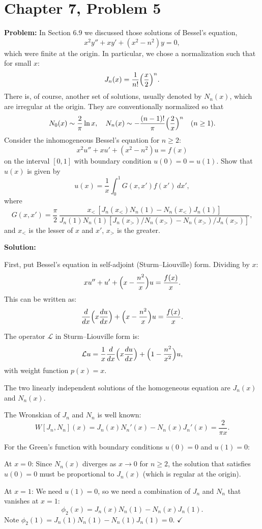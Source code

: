 \documentclass[12pt]{article}
\begin{document}
\section*{Chapter 7, Problem 5}

\textbf{Problem:} In Section 6.9 we discussed those solutions of Bessel's equation,
\[
x^2y'' + xy' + (x^2 - n^2)y = 0,
\]
which were finite at the origin. In particular, we chose a normalization such that for small $x$:
\[
J_n(x) = \frac{1}{n!}\Bigl(\frac{x}{2}\Bigr)^n.
\]
There is, of course, another set of solutions, usually denoted by $N_n(x)$, which are irregular at the origin. They are conventionally normalized so that
\[
N_0(x) \sim \frac{2}{\pi}\ln x, \quad N_n(x) \sim -\frac{(n-1)!}{\pi}\Bigl(\frac{2}{x}\Bigr)^n \quad (n \ge 1).
\]
Consider the inhomogeneous Bessel's equation for $n \ge 2$:
\[
x^2u'' + xu' + (x^2 - n^2)u = f(x)
\]
on the interval $[0,1]$ with boundary condition $u(0) = 0 = u(1)$. Show that $u(x)$ is given by
\[
u(x) = \frac{1}{x}\int_0^1 G(x,x')f(x')\,dx',
\]
where
\[
G(x,x') = \frac{\pi}{2}\,\frac{x_<\,[J_n(x_<)N_n(1) - N_n(x_<)J_n(1)]}{J_n(1)N_n(1)[J_n(x_>)/N_n(x_>) - N_n(x_>)/J_n(x_>)]},
\]
and $x_<$ is the lesser of $x$ and $x'$, $x_>$ is the greater.

\bigskip
\textbf{Solution:}

First, put Bessel's equation in self-adjoint (Sturm--Liouville) form. Dividing by $x$:
\[
xu'' + u' + \Bigl(x - \frac{n^2}{x}\Bigr)u = \frac{f(x)}{x}.
\]
This can be written as:
\[
\frac{d}{dx}\Bigl(x\frac{du}{dx}\Bigr) + \Bigl(x - \frac{n^2}{x}\Bigr)u = \frac{f(x)}{x}.
\]

The operator $\mathcal{L}$ in Sturm--Liouville form is:
\[
\mathcal{L}u = \frac{1}{x}\frac{d}{dx}\Bigl(x\frac{du}{dx}\Bigr) + \Bigl(1 - \frac{n^2}{x^2}\Bigr)u,
\]
with weight function $p(x) = x$.

The two linearly independent solutions of the homogeneous equation are $J_n(x)$ and $N_n(x)$.

The Wronskian of $J_n$ and $N_n$ is well known:
\[
W[J_n, N_n](x) = J_n(x)N_n'(x) - N_n(x)J_n'(x) = \frac{2}{\pi x}.
\]

For the Green's function with boundary conditions $u(0) = 0$ and $u(1) = 0$:

At $x = 0$: Since $N_n(x)$ diverges as $x \to 0$ for $n \ge 2$, the solution that satisfies $u(0) = 0$ must be proportional to $J_n(x)$ (which is regular at the origin).

At $x = 1$: We need $u(1) = 0$, so we need a combination of $J_n$ and $N_n$ that vanishes at $x = 1$:
\[
\phi_2(x) = J_n(x)N_n(1) - N_n(x)J_n(1).
\]
Note $\phi_2(1) = J_n(1)N_n(1) - N_n(1)J_n(1) = 0$. $\checkmark$
\end{document}
